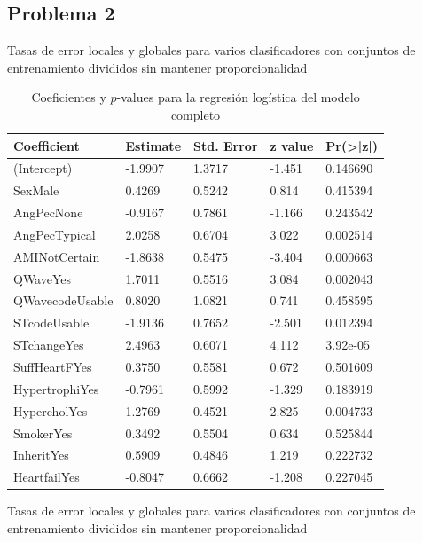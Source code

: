 \documentclass[11pt]{article}
\begin{document}
\subsection*{Problema 2}

\begin{table}[H]
    \caption{Tasas de error locales y globales para varios clasificadores con conjuntos de entrenamiento divididos sin mantener proporcionalidad}
    \label{2-gen-eq-sizeDependence-tab}
\end{table}
\begin{table}
    \centering
    \begin{tabular}{p{3cm}p{2cm}p{2cm}p{2cm}p{2cm}}
        Coefficient  &  Estimate   & Std. Error &  z value & Pr(>|z|)    \\
        \hline
        (Intercept) &     -1.9907  &    1.3717 & -1.451 & 0.146690    \\
        SexMale  &         0.4269  &    0.5242 &  0.814 & 0.415394    \\
        AngPecNone  &     -0.9167  &    0.7861 & -1.166 & 0.243542    \\
        AngPecTypical  &   2.0258  &    0.6704 &  3.022 & 0.002514  \\
        AMINotCertain  &  -1.8638  &    0.5475 & -3.404 & 0.000663 \\
        QWaveYes  &        1.7011  &    0.5516 &  3.084 & 0.002043  \\
        QWavecodeUsable  & 0.8020  &    1.0821 &  0.741 & 0.458595    \\
        STcodeUsable  &   -1.9136  &    0.7652 & -2.501 & 0.012394   \\
        STchangeYes  &     2.4963  &    0.6071 &  4.112 & 3.92e-05 \\
        SuffHeartFYes  &   0.3750  &    0.5581 &  0.672 & 0.501609    \\
        HypertrophiYes  & -0.7961  &    0.5992 & -1.329 & 0.183919    \\
        HypercholYes  &    1.2769  &    0.4521 &  2.825 & 0.004733  \\
        SmokerYes  &       0.3492  &    0.5504 &  0.634 & 0.525844    \\
        InheritYes  &      0.5909  &    0.4846 &  1.219 & 0.222732    \\
        HeartfailYes  &   -0.8047  &    0.6662 & -1.208 & 0.227045 \\
    \end{tabular}
    \caption{Coeficientes y $p$-values para la regresión logística del modelo completo}
    \label{2-log-p}
\end{table}

\begin{table}[H]
    \caption{Tasas de error locales y globales para varios clasificadores con conjuntos de entrenamiento divididos sin mantener proporcionalidad}
    \label{2-final-tab}
\end{table}
\end{document}
